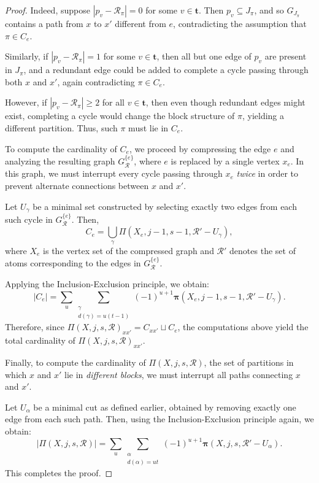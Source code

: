 \documentclass[12pt]{extarticle}
\begin{document}
\begin{proof}
		Indeed, suppose \( |p_v - \mathcal{R}_{\pi}| = 0 \) for some \( v \in \mathbf{t} \). Then \( p_v \subseteq J_{\pi} \), and so \( G_{J_{\pi}} \) contains a path from \( x \) to \( x' \) different from \( e \), contradicting the assumption that \( \pi \in C_e \).
		
		Similarly, if \( |p_v - \mathcal{R}_{\pi}| = 1 \) for some \( v \in \mathbf{t} \), then all but one edge of \( p_v \) are present in \( J_{\pi} \), and a redundant edge could be added to complete a cycle passing through both \( x \) and \( x' \), again contradicting \( \pi \in C_e \).
		
		However, if \( |p_v- \mathcal{R}_{\pi}| \geq 2 \) for all \( v \in \mathbf{t} \), then even though redundant edges might exist, completing a cycle would change the block structure of \( \pi \), yielding a different partition. Thus, such \( \pi \) must lie in \( C_e \).
		
		To compute the cardinality of \( C_e \), we proceed by compressing the edge \( e \) and analyzing the resulting graph \( G_{\mathcal{R}}^{\{e\}} \), where \( e \) is replaced by a single vertex \( x_e \). In this graph, we must interrupt every cycle passing through \( x_e \) \emph{twice} in order to prevent alternate connections between \( x \) and \( x' \).
		
		Let \( U_{\gamma} \) be a minimal set constructed by selecting exactly two edges from each such cycle in \( G_{\mathcal{R}}^{\{e\}} \). Then,
		\[
		C_e = \bigcup_{\gamma} \Pi(X_e, j - 1, s - 1, \mathcal{R}' - U_{\gamma}),
		\]
		where \( X_e \) is the vertex set of the compressed graph and \( \mathcal{R}' \) denotes the set of atoms corresponding to the edges in \( G_{\mathcal{R}}^{\{e\}} \).
		
		Applying the Inclusion-Exclusion principle, we obtain:
		\[
		|C_e| = \sum_u \sum_{\substack{\gamma \\ d(\gamma) = u(t - 1)}} (-1)^{u+1} \bm{\pi}(X_e, j - 1, s - 1, \mathcal{R}' - U_{\gamma}).
		\]
		Therefore, since \( \Pi(X, j, s, \mathcal{R})_{xx'} = C_{xx'} \sqcup C_e \), the computations above yield the total cardinality of \( \Pi(X, j, s, \mathcal{R})_{xx'} \).
		
		Finally, to compute the cardinality of \( \Pi(X, j, s, \mathcal{R}) \), the set of partitions in which \( x \) and \( x' \) lie in \emph{different blocks}, we must interrupt all paths connecting \( x \) and \( x' \).
		
		Let \( U_{\alpha} \) be a minimal cut as defined earlier, obtained by removing exactly one edge from each such path. Then, using the Inclusion-Exclusion principle again, we obtain:
		\[
		|\Pi(X, j, s, \mathcal{R})| = \sum_u \sum_{\substack{\alpha \\ d(\alpha) = ut}} (-1)^{u+1} \bm{\pi}(X, j, s, \mathcal{R}' - U_{\alpha}).
		\]
		This completes the proof.
	\end{proof}
	
\end{document}
